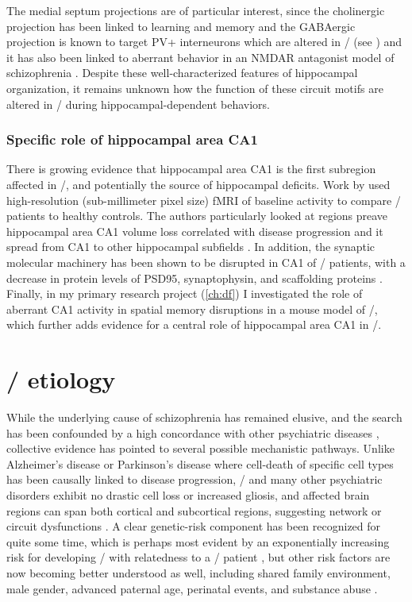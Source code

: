The medial septum projections are of particular interest, since the cholinergic projection has been linked to learning and memory \citep{Parent2004} and the GABAergic projection is known to target PV+ interneurons \citep{Freund1988} which are altered in \scz/ (see ) and it has also been linked to aberrant behavior in an NMDAR antagonist model of schizophrenia \citep{Ma2012}.
Despite these well-characterized features of hippocampal organization, it remains unknown how the function of these circuit motifs are altered in \scz/ during hippocampal-dependent behaviors.

\subsubsection{Specific role of hippocampal area CA1}
There is growing evidence that hippocampal area CA1 is the first subregion affected in \scz/, and potentially the source of hippocampal deficits.
Work by \citeauthor{Schobel2009} used high-resolution (sub-millimeter pixel size) \ac{fMRI} of baseline activity to compare \scz/ patients to healthy controls.
The authors particularly looked at regions preave hippocampal area CA1 volume loss correlated with disease progression and it spread from CA1 to other hippocampal subfields \citep{Ho2017}.
In addition, the synaptic molecular machinery has been shown to be disrupted in CA1 of \scz/ patients, with a decrease in protein levels of PSD95, synaptophysin, and scaffolding proteins \citep{Matosin2016}. 
Finally, in my primary research project (\autoref{ch:df}) I investigated the role of aberrant CA1 activity in spatial memory disruptions in a mouse model of \scz/, which further adds evidence for a central role of hippocampal area CA1 in \scz/.

\section{\Scz/ etiology}
\label{sec:intro:scz:etiology}
While the underlying cause of schizophrenia has remained elusive, and the search has been confounded by a high concordance with other psychiatric diseases \citep{Kessler2005}, collective evidence has pointed to several possible mechanistic pathways.
Unlike Alzheimer's disease or Parkinson's disease where cell-death of specific cell types has been causally linked to disease progression, \scz/ and many other psychiatric disorders exhibit no drastic cell loss or increased gliosis, and affected brain regions can span both cortical and subcortical regions, suggesting network or circuit dysfunctions \citep{Uhlhaas2012, Lewis2002}.
A clear genetic-risk component has been recognized for quite some time, which is perhaps most evident by an exponentially increasing risk for developing \scz/ with relatedness to a \scz/ patient \citep{Rodriguez-Murillo2012}, but other risk factors are now becoming better understood as well, including shared family environment, male gender, advanced paternal age, perinatal events, and substance abuse \citep{Lichtenstein2009}.

